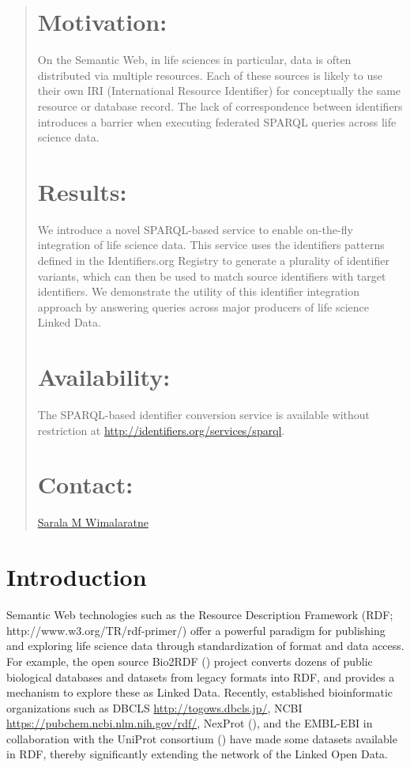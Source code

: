\documentclass{bioinfo}
\begin{document}
\begin{abstract}
\section{Motivation:}
On the Semantic Web, in life sciences in particular, data is often distributed via multiple resources. Each of these sources is likely to use their own IRI (International Resource Identifier) for conceptually the same resource or database record. The lack of correspondence between identifiers introduces a barrier when executing federated SPARQL queries across life science data.

\section{Results:}
We introduce a novel SPARQL-based service to enable on-the-fly integration of life science data. This service uses the identifiers patterns defined in the Identifiers.org Registry to generate a plurality of identifier variants, which can then be used to match source identifiers with target identifiers. We demonstrate the utility of this identifier integration approach by answering queries across major producers of life science Linked Data.

\section{Availability:}
The SPARQL-based identifier conversion service is available without restriction at \linebreak\href{http://identifiers.org/services/sparql}{http://identifiers.org/services/sparql}.

\section{Contact:} \href{sarala@ebi.ac.uk}{Sarala M Wimalaratne}
\end{abstract}

\section{Introduction}
Semantic Web technologies such as the Resource Description Framework (RDF; http://www.w3.org/TR/rdf-primer/) offer a powerful paradigm for publishing and exploring life science data through standardization of format and data access. For example, the open source Bio2RDF (\cite{Biordf2}) project converts dozens of public biological databases and datasets from legacy formats into RDF, and provides a mechanism to explore these as Linked Data. Recently, established bioinformatic organizations such as DBCLS \href{http://togows.dbcls.jp/}{http://togows.dbcls.jp/}, NCBI \href{https://pubchem.ncbi.nlm.nih.gov/rdf/}{https://pubchem.ncbi.nlm.nih.gov/rdf/}, NexProt (\cite{Chichester2014}), and the EMBL-EBI in collaboration with the UniProt consortium (\cite{Jupp01052014}) have made some datasets available in RDF, thereby significantly extending the network of the Linked Open Data.
\end{document}
